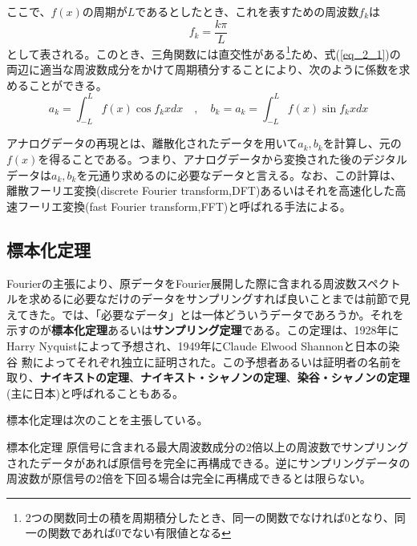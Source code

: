 ここで、$f(x)$の周期が$L$であるとしたとき、これを表すための周波数$f_k$は
\begin{equation}
f_k=\frac{k\pi}{L}
\end{equation}
として表される。このとき、三角関数には直交性がある\footnote{2つの関数同士の積を周期積分したとき、同一の関数でなければ0となり、同一の関数であれば0でない有限値となる}ため、式(\ref{eq_2_1})の両辺に適当な周波数成分をかけて周期積分することにより、次のように係数を求めることができる。
\begin{equation}
a_k=\int^{L}_{-L} f(x) \cos f_kx dx \quad , \quad b_k=a_k=\int^{L}_{-L} f(x) \sin f_kx dx \label{eq_2_2}
\end{equation}

アナログデータの再現とは、離散化されたデータを用いて$a_k,b_k$を計算し、元の$f(x)$を得ることである。つまり、アナログデータから変換された後のデジタルデータは$a_k,b_k$を元通り求めるのに必要なデータと言える。なお、この計算は、離散フーリエ変換(discrete Fourier transform,DFT)あるいはそれを高速化した高速フーリエ変換(fast Fourier transform,FFT)と呼ばれる手法による。

\subsection{標本化定理}

Fourierの主張により、原データをFourier展開した際に含まれる周波数スペクトルを求めるに必要なだけのデータをサンプリングすれば良いことまでは前節で見えてきた。では、「必要なデータ」とは一体どういうデータであろうか。それを示すのが\textbf{標本化定理}あるいは\textbf{サンプリング定理}である。この定理は、1928年にHarry Nyquistによって予想され、1949年にClaude Elwood Shannonと日本の染谷 勲によってそれぞれ独立に証明された。この予想者あるいは証明者の名前を取り、\textbf{ナイキストの定理}、\textbf{ナイキスト・シャノンの定理}、\textbf{染谷・シャノンの定理}(主に日本)と呼ばれることもある。

標本化定理は次のことを主張している。
\begin{itembox}[l]{標本化定理}
原信号に含まれる最大周波数成分の2倍以上の周波数でサンプリングされたデータがあれば原信号を完全に再構成できる。逆にサンプリングデータの周波数が原信号の2倍を下回る場合は完全に再構成できるとは限らない。
\end{itembox}

